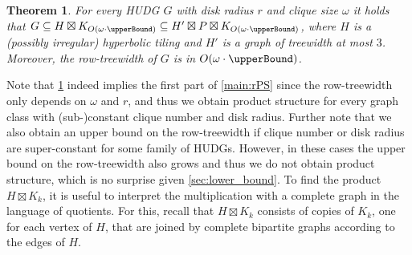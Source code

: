 \documentclass[11pt]{article}
\newtheorem{theorem}{Theorem}
\newcommand{\calP}{\ensuremath{\mathcal{P}}\xspace}
\begin{document}
\begin{theorem}\label{thm:upper_bound}
    For every HUDG $ G $ with disk radius $ r $ and clique size $ \omega $ it holds that $ G \subseteq H \boxtimes K_{O(\omega \cdot \upperBound)} \subseteq H' \boxtimes P \boxtimes K_{O(\omega \cdot \upperBound)}$, where $ H $ is a (possibly irregular) hyperbolic tiling and $ H' $ is a graph of treewidth at most $ 3 $.
    Moreover, the row-treewidth of $ G $ is in $ O(\omega \cdot \upperBound) $.
\end{theorem}

%
Note that \cref{thm:upper_bound} indeed implies the first part of \cref{main:rPS}
since the row-treewidth only depends on $ \omega $ and $ r $, and thus we obtain product structure for every graph class with (sub-)constant clique number and disk radius.
Further note that we also obtain an upper bound on the row-treewidth if clique number or disk radius are super-constant for some family of HUDGs.
However, in these cases the upper bound on the row-treewidth also grows and thus we do not obtain product structure, which is no surprise given \cref{sec:lower_bound}.
%
%
To find the product $ H \boxtimes K_k $, it is useful to interpret the multiplication with a complete graph in the language of quotients.
For this, recall that $ H \boxtimes K_k $ consists of copies of $ K_k $, one for each vertex of $ H $, that are joined by complete bipartite graphs according to the edges of $ H $.
\end{document}
